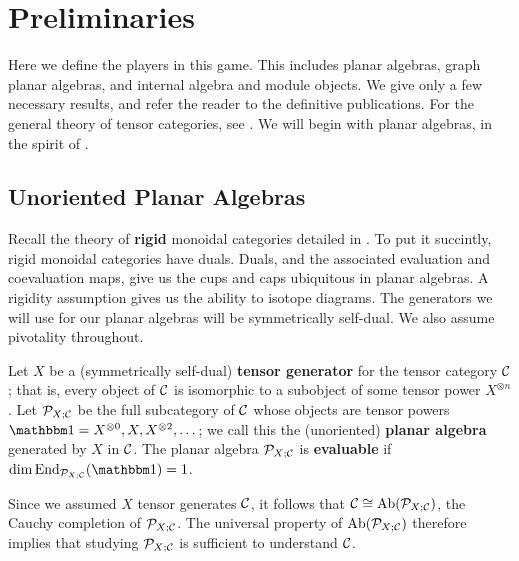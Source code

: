 \section{Preliminaries}\label{sec:prelim}
Here we define the players in this game. 
This includes planar algebras, graph planar algebras, and internal algebra and module objects.
We give only a few necessary results, and refer the reader to the definitive publications.
For the general theory of tensor categories, see \cite{EGNO}.
We will begin with planar algebras, in the spirit of \cite{tricats}.



\subsection{Unoriented Planar Algebras}
Recall the theory of {\bf rigid} monoidal categories detailed in \cite{KW}. 
To put it succintly, rigid monoidal categories have duals. 
Duals, and the associated evaluation and coevaluation maps, give us the cups and caps ubiquitous in planar algebras. 
A rigidity assumption gives us the ability to isotope diagrams. 
The generators we will use for our planar algebras will be symmetrically self-dual.
We also assume pivotality throughout.

Let $X$ be a (symmetrically self-dual) {\bf tensor generator} for the tensor category $\mathcal{C}$; 
that is, every object of $\mathcal{C}$ is isomorphic to a subobject of some tensor power $X^{\otimes n}$. 
Let $\mathcal{P}_{X;\mathcal{C}}$ be the full subcategory of $\mathcal{C}$ whose objects are tensor powers $\unit=X^{\otimes0},X,X^{\otimes2},\dots$; 
we call this the (unoriented) {\bf planar algebra} generated by $X$ in $\mathcal{C}$. 
The planar algebra $\mathcal{P}_{X;\mathcal{C}}$ is {\bf evaluable} if $\dim\End_{\PP_{X;\CC}}(\unit)=1$.

Since we assumed $X$ tensor generates $\mathcal{C}$, it follows that $\mathcal{C} \cong \operatorname{Ab}(\mathcal{P}_{X;\mathcal{C}})$, 
the Cauchy completion of $\mathcal{P}_{X;\mathcal{C}}$. 
The universal property of $\operatorname{Ab}(\mathcal{P}_{X;\mathcal{C}})$ therefore implies 
that studying $\mathcal{P}_{X;\mathcal{C}}$ is sufficient to understand $\mathcal{C}$.  

